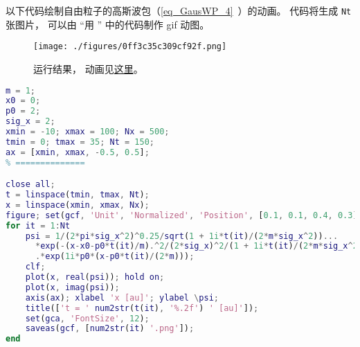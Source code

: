
\begin{issues}
\issueDraft
\end{issues}


以下代码绘制自由粒子的高斯波包（\autoref{eq_GausWP_4}~）的动画。 代码将生成 \verb|Nt| 张图片， 可以由 “用 ” 中的代码制作 gif 动图。

\begin{figure}[ht]
\centering
\texttt{[image: ./figures/0ff3c35c309cf92f.png]}
\caption{运行结果， 动画见\href{https://wuli.wiki/apps/free_gauss.html}{这里}。} \label{fig_FreeGs_1}
\end{figure}

\begin{lstlisting}[language=matlab, caption=free\_gauss.m]
% === 参数 (原子单位) ===
m = 1;
x0 = 0;
p0 = 2;
sig_x = 2;
xmin = -10; xmax = 100; Nx = 500;
tmin = 0; tmax = 35; Nt = 150;
ax = [xmin, xmax, -0.5, 0.5];
% ==============

close all;
t = linspace(tmin, tmax, Nt);
x = linspace(xmin, xmax, Nx);
figure; set(gcf, 'Unit', 'Normalized', 'Position', [0.1, 0.1, 0.4, 0.3]);
for it = 1:Nt
    psi = 1/(2*pi*sig_x^2)^0.25/sqrt(1 + 1i*t(it)/(2*m*sig_x^2))...
      *exp(-(x-x0-p0*t(it)/m).^2/(2*sig_x)^2/(1 + 1i*t(it)/(2*m*sig_x^2)))...
      .*exp(1i*p0*(x-p0*t(it)/(2*m)));
    clf;
    plot(x, real(psi)); hold on;
    plot(x, imag(psi));
    axis(ax); xlabel 'x [au]'; ylabel \psi;
    title(['t = ' num2str(t(it), '%.2f') ' [au]']);
    set(gca, 'FontSize', 12);
    saveas(gcf, [num2str(it) '.png']);
end
\end{lstlisting}
